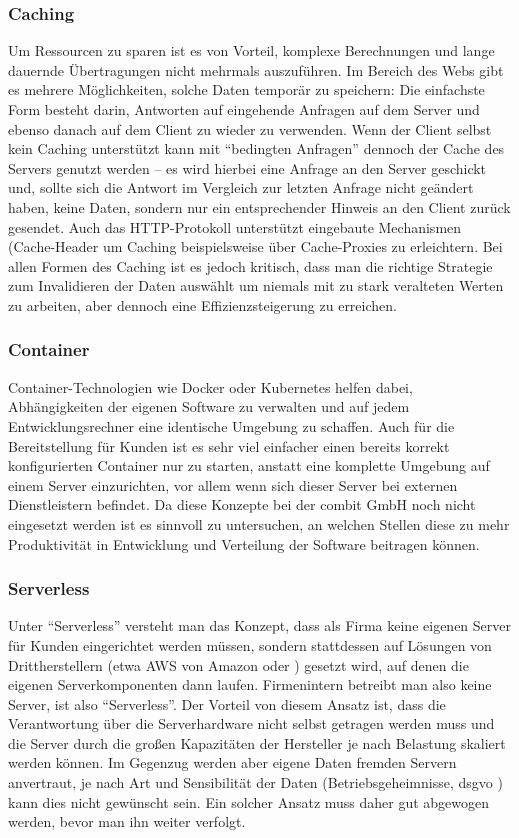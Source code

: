\subsubsection{Caching}
Um Ressourcen zu sparen ist es von Vorteil, komplexe Berechnungen und lange dauernde Übertragungen nicht mehrmals auszuführen. Im Bereich des Webs gibt es mehrere Möglichkeiten, solche Daten temporär zu speichern: Die einfachste Form besteht darin, Antworten auf eingehende Anfragen auf dem Server und ebenso danach auf dem Client zu wieder zu verwenden. Wenn der Client selbst kein Caching unterstützt kann mit ``bedingten Anfragen'' dennoch der Cache des Servers genutzt werden -- es wird hierbei eine Anfrage an den Server geschickt und, sollte sich die Antwort im Vergleich zur letzten Anfrage nicht geändert haben, keine Daten, sondern nur ein entsprechender Hinweis an den Client zurück gesendet. Auch das HTTP-Protokoll unterstützt eingebaute Mechanismen (Cache-Header  um Caching beispielsweise über Cache-Proxies zu erleichtern. Bei allen Formen des Caching ist es jedoch kritisch, dass man die richtige Strategie zum Invalidieren der Daten auswählt um niemals mit zu stark veralteten Werten zu arbeiten, aber dennoch eine Effizienzsteigerung zu erreichen.

\subsubsection{Container}
Container-Technologien wie Docker oder Kubernetes helfen dabei, Abhängigkeiten der eigenen Software zu verwalten und auf jedem Entwicklungsrechner eine identische Umgebung zu schaffen. Auch für die Bereitstellung für Kunden ist es sehr viel einfacher einen bereits korrekt konfigurierten Container nur zu starten, anstatt eine komplette Umgebung auf einem Server einzurichten, vor allem wenn sich dieser Server bei externen Dienstleistern befindet. Da diese Konzepte bei der combit GmbH noch nicht eingesetzt werden ist es sinnvoll zu untersuchen, an welchen Stellen diese zu mehr Produktivität in Entwicklung und Verteilung der Software beitragen können.

\subsubsection{Serverless}
Unter ``Serverless'' versteht man das Konzept, dass als Firma keine eigenen Server für Kunden eingerichtet werden müssen, sondern stattdessen auf Lösungen von Drittherstellern (etwa AWS von Amazon oder ) gesetzt wird, auf denen die eigenen Serverkomponenten dann laufen. Firmenintern betreibt man also keine Server, ist also ``Serverless''. Der Vorteil von diesem Ansatz ist, dass die Verantwortung über die Serverhardware nicht selbst getragen werden muss und die Server durch die großen Kapazitäten der Hersteller je nach Belastung skaliert werden können. Im Gegenzug werden aber eigene Daten fremden Servern anvertraut, je nach Art und Sensibilität der Daten (Betriebsgeheimnisse, \gls{dsgvo} ) kann dies nicht gewünscht sein. Ein solcher Ansatz muss daher gut abgewogen werden, bevor man ihn weiter verfolgt.

